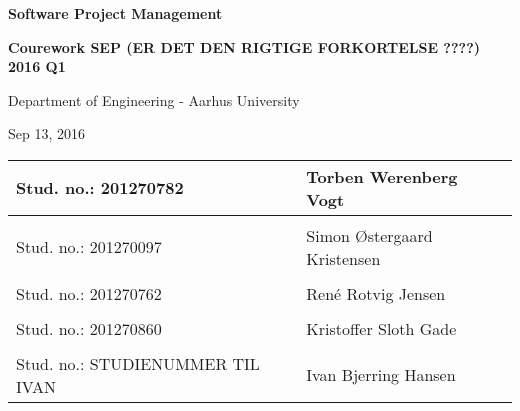 
\centerline{\Huge\bfseries\color{ThemeColor} Software Project Management}

\vspace{1em}
\centerline{\Large\bfseries\color{BlackColor} Courework SEP (ER DET DEN RIGTIGE FORKORTELSE ????) 2016 Q1}



\vspace{5em}
\centerline{\large\bfseries\color{BlackColor}}
\centerline{\large\color{BlackColor}Department of Engineering - Aarhus University}

\vspace{0.5em}
\centerline{\large\color{BlackColor} Sep 13, 2016}

\vspace{25em}

\begin{center}
   \begin{tabular}{ l p{3cm} l l }
   Stud. no.: 201270782 && Torben Werenberg Vogt & \\\hline
   & & \\
   Stud. no.: 201270097 && Simon Østergaard Kristensen & \\\hline
   & & \\
   Stud. no.: 201270762 && René Rotvig Jensen & \\\hline
   & & \\
   Stud. no.: 201270860 && Kristoffer Sloth Gade & \\\hline
  & & \\
  Stud. no.: STUDIENUMMER TIL IVAN &&  Ivan Bjerring Hansen & \\\hline
   \end{tabular}
\end{center}
\thispagestyle{empty} %
\restoregeometry

